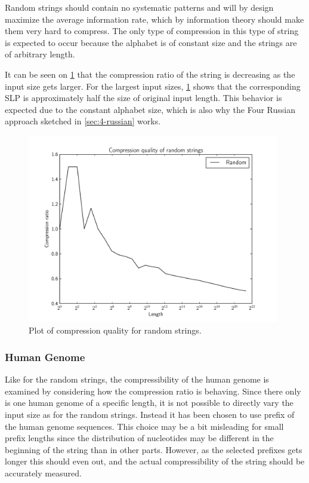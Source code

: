 \documentclass[twoside,11pt,openright]{report}
\begin{document}
Random strings should contain no systematic patterns and will by design maximize the average information rate, which by information theory should make them very hard to compress. The only type of compression in this type of string is expected to occur because the alphabet is of constant size and the strings are of arbitrary length.

It can be seen on \cref{fig:compression:quality:random} that the compression ratio of the string is decreasing as the input size gets larger. For the largest input sizes, \cref{fig:compression:quality:random} shows that the corresponding SLP is approximately half the size of original input length. This behavior is expected due to the constant alphabet size, which is also why the Four Russian approach sketched in \cref{sec:4-russian} works.
%
\begin{figure}[h!]
  \centering
  \includegraphics[width=11cm]{compression/random}
  \caption{Plot of compression quality for random strings.}
  \label{fig:compression:quality:random}
\end{figure}

\subsubsection{Human Genome}
Like for the random strings, the compressibility of the human genome is examined by considering how the compression ratio is behaving. Since there only is one human genome of a specific length, it is not possible to directly vary the input size as for the random strings. Instead it has been chosen to use prefix of the human genome sequences. This choice may be a bit misleading for small prefix lengths since the distribution of nucleotides may be different in the beginning of the string than in other parts. However, as the selected prefixes gets longer this should even out, and the actual compressibility of the string should be accurately measured.
\end{document}
